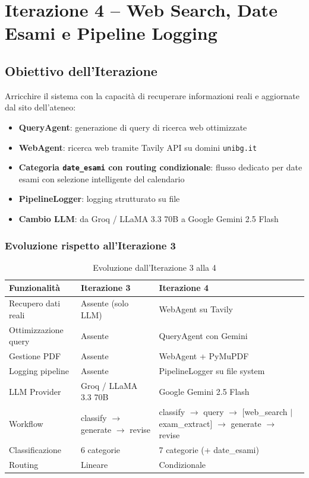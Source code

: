 \documentclass[a4paper,12pt]{report}
\begin{document}
\chapter{Iterazione 4 -- Web Search, Date Esami e Pipeline Logging}

\section{Obiettivo dell'Iterazione}

Arricchire il sistema con la capacità di recuperare informazioni reali e aggiornate dal sito dell'ateneo:
\begin{itemize}
    \item \textbf{QueryAgent}: generazione di query di ricerca web ottimizzate
    \item \textbf{WebAgent}: ricerca web tramite Tavily API su domini \texttt{unibg.it}
    \item \textbf{Categoria \texttt{date\_esami} con routing condizionale}: flusso dedicato per date esami con selezione intelligente del calendario
    \item \textbf{PipelineLogger}: logging strutturato su file
    \item \textbf{Cambio LLM}: da Groq / LLaMA 3.3 70B a Google Gemini 2.5 Flash
\end{itemize}

\subsection{Evoluzione rispetto all'Iterazione 3}

\begin{table}[H]
\centering
\small
\begin{tabularx}{\textwidth}{l X X}
\toprule
\textbf{Funzionalità} & \textbf{Iterazione 3} & \textbf{Iterazione 4} \\
\midrule
Recupero dati reali & Assente (solo LLM) & WebAgent su Tavily \\
Ottimizzazione query & Assente & QueryAgent con Gemini \\
Gestione PDF & Assente & WebAgent + PyMuPDF \\
Logging pipeline & Assente & PipelineLogger su file system \\
LLM Provider & Groq / LLaMA 3.3 70B & Google Gemini 2.5 Flash \\
Workflow & classify $\rightarrow$ generate $\rightarrow$ revise & classify $\rightarrow$ query $\rightarrow$ [web\_search $|$ exam\_extract] $\rightarrow$ generate $\rightarrow$ revise \\
Classificazione & 6 categorie & 7 categorie (+ date\_esami) \\
Routing & Lineare & Condizionale \\
\bottomrule
\end{tabularx}
\caption{Evoluzione dall'Iterazione 3 alla 4}
\end{table}
\end{document}
